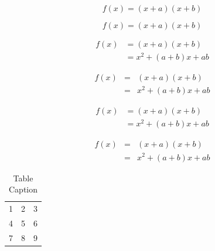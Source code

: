 \documentclass[preprint,12pt,authoryear]{elsarticle}
\begin{document}
\begin{equation}
f(x) = (x+a)(x+b)
\end{equation}

\begin{equation*}
f(x) = (x+a)(x+b)
\end{equation*}

\begin{align}
 f(x) &= (x+a)(x+b) \\
      &= x^2 + (a+b)x + ab
\end{align}

\begin{eqnarray}
 f(x) &=& (x+a)(x+b) \nonumber\\ %
      &=& x^2 + (a+b)x + ab
\end{eqnarray}

\begin{align*}
 f(x) &= (x+a)(x+b) \\
      &= x^2 + (a+b)x + ab
\end{align*}

\begin{eqnarray*}
 f(x)&=& (x+a)(x+b) \\
     &=& x^2 + (a+b)x + ab
\end{eqnarray*}


\begin{table}[t]%
\centering%
\begin{tabular}{l c r}%
  1 & 2 & 3 \\ %
  4 & 5 & 6 \\
  7 & 8 & 9 \\
\end{tabular}
\caption{Table Caption}\label{fig1}
\end{table}
\end{document}
